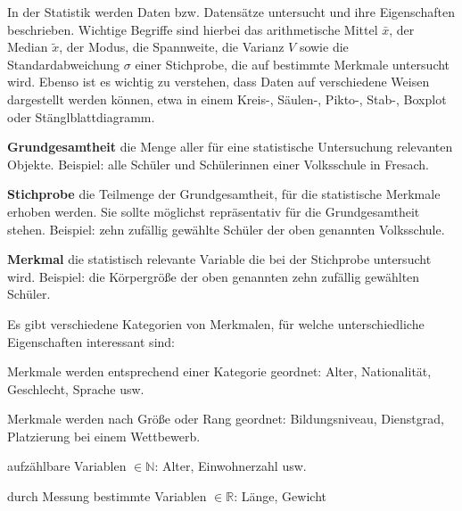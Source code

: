 



\thispagestyle{plain}



In der Statistik werden Daten bzw. Datens\"{a}tze untersucht und ihre Eigenschaften beschrieben. Wichtige Begriffe sind hierbei das arithmetische Mittel $\bar{x}$, der Median $\tilde{x}$, der Modus, die Spannweite, die Varianz $V$ sowie die Standardabweichung $\sigma$ einer Stichprobe, die auf bestimmte Merkmale untersucht wird. Ebenso ist es wichtig zu verstehen, dass Daten auf verschiedene Weisen dargestellt werden k\"{o}nnen, etwa in einem Kreis-, S\"{a}ulen-, Pikto-, Stab-, Boxplot oder St\"{a}nglblattdiagramm. 


\textbf{Grundgesamtheit}  die Menge aller f\"{u}r eine statistische Untersuchung relevanten Objekte. Beispiel: alle Sch\"{u}ler und Sch\"{u}lerinnen einer Volksschule in Fresach.

\textbf{Stichprobe}  die Teilmenge der Grundgesamtheit, f\"{u}r die statistische Merkmale erhoben werden. Sie sollte m\"{o}glichst repr\"{a}sentativ f\"{u}r die Grundgesamtheit stehen. Beispiel: zehn zuf\"{a}llig gew\"{a}hlte Sch\"{u}ler der oben genannten Volksschule.

\textbf{Merkmal}  die statistisch relevante Variable die bei der Stichprobe untersucht wird. Beispiel: die K\"{o}rpergr\"{o}\ss{}e der oben genannten zehn zuf\"{a}llig gew\"{a}hlten Sch\"{u}ler. 

Es gibt verschiedene Kategorien von Merkmalen, f\"{u}r welche unterschiedliche Eigenschaften interessant sind:

\begin{itemize}


	Merkmale werden entsprechend einer Kategorie geordnet: Alter, Nationalit\"{a}t, Geschlecht, Sprache usw.


	Merkmale werden nach Gr\"{o}\ss{}e oder Rang geordnet: Bildungsniveau, Dienstgrad, Platzierung bei einem Wettbewerb.


		\begin{itemize}

			  aufz\"{a}hlbare Variablen $\in \mathbb{N}$: Alter, Einwohnerzahl usw.

			  durch Messung bestimmte Variablen $\in \mathbb{R}$: L\"{a}nge, Gewicht

		\end{itemize}

\end{itemize}

